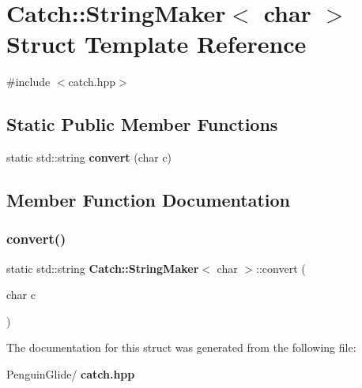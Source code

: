 \section{Catch\+::String\+Maker$<$ char $>$ Struct Template Reference}
\label{struct_catch_1_1_string_maker_3_01char_01_4}


{\ttfamily \#include $<$catch.\+hpp$>$}

\subsection*{Static Public Member Functions}
\begin{DoxyCompactItemize}
\item 
static std\+::string \textbf{ convert} (char c)
\end{DoxyCompactItemize}


\subsection{Member Function Documentation}
\mbox{\label{struct_catch_1_1_string_maker_3_01char_01_4_a4e3db69a12bb83f3ef89251893e65da5}} 
\subsubsection{convert()}
{\footnotesize\ttfamily static std\+::string \textbf{ Catch\+::\+String\+Maker}$<$ char $>$\+::convert (\begin{DoxyParamCaption}\item[{char}]{c }\end{DoxyParamCaption})\hspace{0.3cm}{\ttfamily [static]}}



The documentation for this struct was generated from the following file\+:\begin{DoxyCompactItemize}
\item 
Penguin\+Glide/\textbf{ catch.\+hpp}\end{DoxyCompactItemize}
